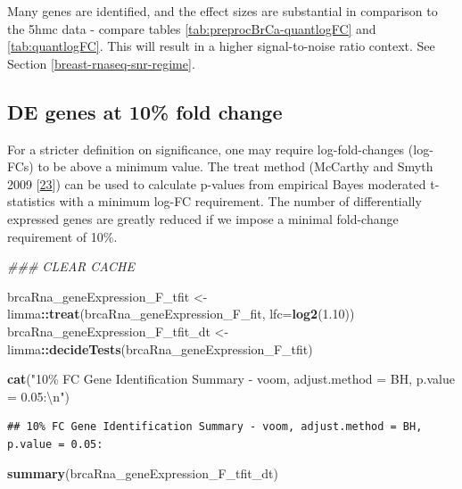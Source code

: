 \documentclass[
]{book}
\newenvironment{Shaded}{\begin{snugshade}}{\end{snugshade}}
\newcommand{\CharTok}[1]{\textcolor[rgb]{0.31,0.60,0.02}{#1}}
\newcommand{\CommentTok}[1]{\textcolor[rgb]{0.56,0.35,0.01}{\textit{#1}}}
\newcommand{\DataTypeTok}[1]{\textcolor[rgb]{0.13,0.29,0.53}{#1}}
\newcommand{\FloatTok}[1]{\textcolor[rgb]{0.00,0.00,0.81}{#1}}
\newcommand{\KeywordTok}[1]{\textcolor[rgb]{0.13,0.29,0.53}{\textbf{#1}}}
\newcommand{\NormalTok}[1]{#1}
\newcommand{\OperatorTok}[1]{\textcolor[rgb]{0.81,0.36,0.00}{\textbf{#1}}}
\newcommand{\StringTok}[1]{\textcolor[rgb]{0.31,0.60,0.02}{#1}}
\begin{document}
Many genes are identified, and the effect sizes are substantial
in comparison to the 5hmc data - compare tables
\ref{tab:preprocBrCa-quantlogFC} and
\ref{tab:quantlogFC}.
This will result in a higher signal-to-noise ratio context. See
Section \ref{breast-rnaseq-snr-regime}.

\hypertarget{de-genes-at-10-fold-change-1}{%
\subsection*{DE genes at 10\% fold change}\label{de-genes-at-10-fold-change-1}}

For a stricter definition on significance, one may require log-fold-changes
(log-FCs) to be above a minimum value. The treat method
(McCarthy and Smyth 2009 {[}\protect\hyperlink{ref-McCarthy:2009aa}{23}{]}) can be used to calculate p-values
from empirical Bayes moderated t-statistics with a minimum log-FC requirement.
The number of differentially expressed genes are greatly reduced if we
impose a minimal fold-change requirement of 10\%.

\begin{Shaded}
\begin{Highlighting}[]
\CommentTok{\#\#\#  CLEAR CACHE}

\NormalTok{brcaRna\_geneExpression\_F\_tfit <{-}}\StringTok{ }\NormalTok{limma}\OperatorTok{::}\KeywordTok{treat}\NormalTok{(brcaRna\_geneExpression\_F\_fit, }\DataTypeTok{lfc=}\KeywordTok{log2}\NormalTok{(}\FloatTok{1.10}\NormalTok{))}
\NormalTok{brcaRna\_geneExpression\_F\_tfit\_dt <{-}}\StringTok{ }\NormalTok{limma}\OperatorTok{::}\KeywordTok{decideTests}\NormalTok{(brcaRna\_geneExpression\_F\_tfit)}

\KeywordTok{cat}\NormalTok{(}\StringTok{"10\% FC Gene Identification Summary {-} voom, adjust.method = BH, p.value = 0.05:}\CharTok{\textbackslash{}n}\StringTok{"}\NormalTok{)}
\end{Highlighting}
\end{Shaded}

\begin{verbatim}
## 10% FC Gene Identification Summary - voom, adjust.method = BH, p.value = 0.05:
\end{verbatim}

\begin{Shaded}
\begin{Highlighting}[]
\KeywordTok{summary}\NormalTok{(brcaRna\_geneExpression\_F\_tfit\_dt)}
\end{Highlighting}
\end{Shaded}
\end{document}
